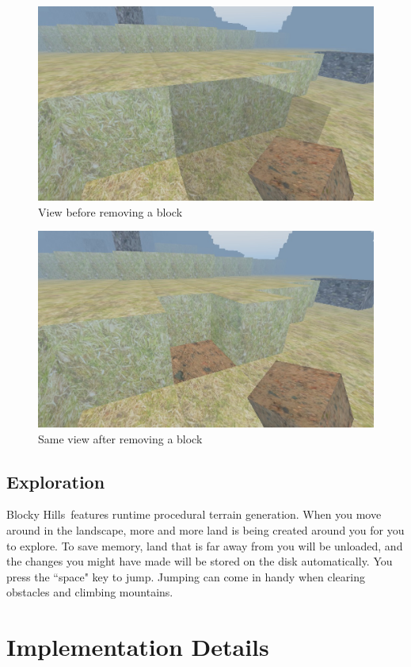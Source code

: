 \documentclass{report}
\newcommand{\gamename}{Blocky Hills}
\begin{document}
\begin{figure}[hp]
	\centering
	\includegraphics[scale=0.5]{removeblockbefore}
	\caption{View before removing a block}
	\label{fig:removebefore}
\end{figure}
\begin{figure}[hp]
	\centering
	\includegraphics[scale=0.5]{removeblockafter}
	\caption{Same view after removing a block}
	\label{fig:removeafter}
\end{figure}
\subsection{Exploration}
\gamename\ features runtime procedural terrain generation. When you move around in the landscape, more and more land is being created around you for you to explore. To save memory, land that is far away from you will be unloaded, and the changes you might have made will be stored on the disk automatically. You press the ``space" key to jump. Jumping can come in handy when clearing obstacles and climbing mountains.
\section{Implementation Details}
\end{document}
